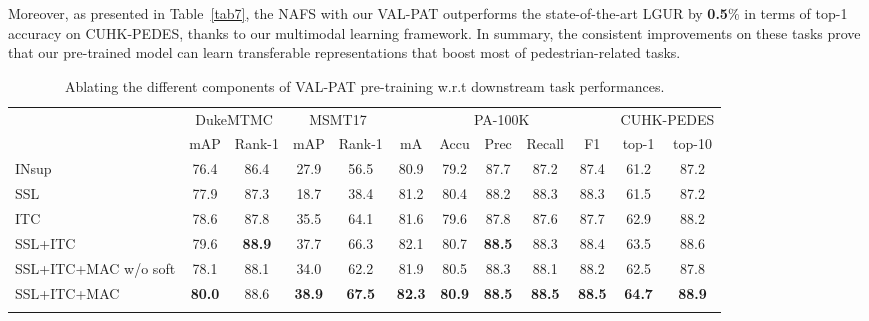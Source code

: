 \documentclass[final]{cvpr}
\begin{document}
Moreover, as presented in Table~\ref{tab7}, the NAFS with our VAL-PAT outperforms the state-of-the-art LGUR by \textbf{0.5}\% in terms of top-1 accuracy on CUHK-PEDES, thanks to our multimodal learning framework.
In summary, the consistent improvements on these tasks prove that our pre-trained model can learn transferable representations that boost most of pedestrian-related tasks. 

\begin{table*}[h!]
\small
\centering
\setlength{\tabcolsep}{2.67mm}
\begin{tabular}{l|cc|cc|ccccc|cc}
\shline
    \multirow{2}{*}{pre-train} & \multicolumn{2}{c|}{DukeMTMC} & \multicolumn{2}{c|}{MSMT17} & \multicolumn{5}{c|}{PA-100K} & \multicolumn{2}{c}{CUHK-PEDES} \\
    \cline{2-12} & mAP & Rank-1 & mAP & Rank-1 & mA & Accu & Prec & Recall & F1 & top-1 & top-10\\ 
    \hline
INsup  & 76.4 & 86.4 & 27.9 & 56.5 & 80.9 & 79.2 & 87.7 & 87.2 & 87.4 & 61.2 & 87.2  \\
      SSL  & 77.9 & 87.3 & 18.7 & 38.4 & 81.2 & 80.4 & 88.2 & 88.3 & 88.3 & 61.5 & 87.2  \\
      ITC  & 78.6 & 87.8 & 35.5 & 64.1 & 81.6 & 79.6 & 87.8 & 87.6 & 87.7 & 62.9 & 88.2 \\
      SSL+ITC        & 79.6 & \textbf{88.9} & 37.7 & 66.3 & 82.1 & 80.7 & \textbf{88.5} & 88.3 & 88.4 & 63.5 & 88.6 \\
      SSL+ITC+MAC \footnotesize{w/o soft}  & 78.1 & 88.1 & 34.0 & 62.2 & 81.9 & 80.5 & 88.3 & 88.1 & 88.2 & 62.5 & 87.8 \\
      SSL+ITC+MAC  & \textbf{80.0} & 88.6 & \textbf{38.9} & \textbf{67.5} & \textbf{82.3} & \textbf{80.9} & \textbf{88.5} & \textbf{88.5} & \textbf{88.5} & \textbf{64.7} & \textbf{88.9} \\
    \shline
\end{tabular}\\
\vspace{-2mm}
\caption{Ablating the different components of VAL-PAT pre-training w.r.t downstream task performances. }
\label{tab8}
\vspace{-3mm}
\end{table*}
\end{document}
